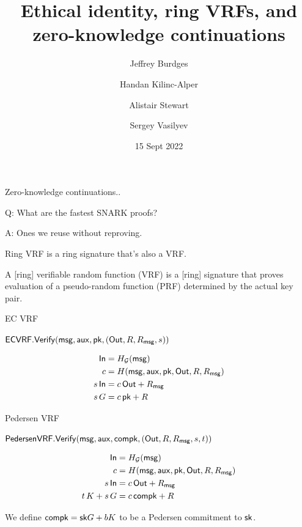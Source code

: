 \documentclass{beamer}
\title{Ethical identity, ring VRFs, and \\ zero-knowledge continuations}
\author{Jeffrey Burdges \and Handan Kilinc-Alper \and Alistair Stewart \and Sergey Vasilyev}
\date{15 Sept 2022}
\def\compk{\ensuremath{\mathsf{compk}}\xspace}
\begin{document}
\maketitle


\begin{frame}

Zero-knowledge continuations..
	
\bigskip

Q: What are the fastest SNARK proofs?

\bigskip

A: Ones we reuse without reproving.

\end{frame}



\begin{frame}

Ring VRF is a ring signature that's also a VRF.

\bigskip\bigskip 

A [ring] verifiable random function (VRF) is a [ring] signature that proves evaluation of a pseudo-random function (PRF) determined by the actual key pair.


\end{frame}



\begin{frame}{EC VRF}

$\mathsf{ECVRF}.{\mathsf{Verify}}(\mathsf{msg},\mathsf{aux},\mathsf{pk},({\mathsf{Out}},R,R_\mathsf{msg},s))$

$$ \begin{aligned}
{\ensuremath{\mathsf{In}}} &= H_{\mathcal{G}}(\mathsf{msg}) \\
c &= H(\mathsf{msg},\mathsf{aux},\mathsf{pk},{\mathsf{Out}},R,R_\mathsf{msg}) \\
s \, {\mathsf{In}} &= c \, {\mathsf{Out}} + R_\mathsf{msg} \\
s \, G &= c \, \mathsf{pk} + R \\
\end{aligned} $$

\end{frame}



\begin{frame}{Pedersen VRF}

$\mathsf{PedersenVRF}.\Verify(\msg,\aux,\compk,(\Out,R,R_\msg,s,t))$
	
$$ \begin{aligned}
\In &= H_{\mathcal{G}}(\msg) \\
c &= H(\msg,\aux,\pk,\Out,R,R_\msg) \\
s \, \In &= c \, \Out + R_\msg \\
t \, K + s \, G &= c \, \compk + R \\
\end{aligned} $$

\bigskip\bigskip

We define $\compk = \sk G + b K$ to be a Pedersen commitment to $\mathsf{sk}$.
	
\end{frame}
\end{document}
